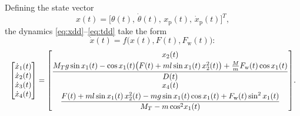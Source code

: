 \documentclass[twocolumn]{svjour3}
\begin{document}
Defining the state vector
\begin{equation}
    x(t) = \bigl[\theta(t),\,\dot{\theta}(t),\,x_\mathrm{p}(t),\,\dot{x}_\mathrm{p}(t)\bigr]^T,
\end{equation}
the dynamics \eqref{eq:xdd}--\eqref{eq:tdd} take the form
\begin{equation}
    \dot{x}(t) = f\bigl(x(t),F(t),F_\mathrm{w}(t)\bigr):
\end{equation}
\begin{equation}
\resizebox{\columnwidth}{!}{$\displaystyle
\begin{bmatrix}\dot{x}_1(t)\\\dot{x}_2(t)\\\dot{x}_3(t)\\\dot{x}_4(t)\end{bmatrix}
=
\begin{bmatrix}
x_2(t)\\[2pt]
\dfrac{M_T g\sin x_1(t) - \cos x_1(t)\!\left(F(t) + ml\sin x_1(t)\,x_2^{2}(t)\right)
 + \frac{M}{m}F_\mathrm{w}(t)\cos x_1(t)}{D(t)}\\[6pt]
x_4(t)\\[2pt]
\dfrac{F(t) + ml\sin x_1(t)\,x_2^{2}(t) - mg\sin x_1(t)\cos x_1(t)
 + F_\mathrm{w}(t)\sin^{2}x_1(t)}{M_T - m\cos^{2}\!x_1(t)}
\end{bmatrix}$}.\label{eq:nonlin_ss}
\end{equation}
\end{document}
